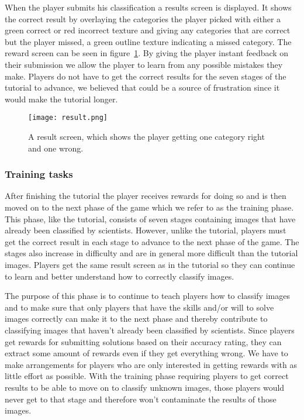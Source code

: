 When the player submits his classification a results screen is displayed. It shows the correct result by overlaying the categories the player picked with either a green correct or red incorrect texture and giving any categories that are correct but the player missed, a green outline texture indicating a missed category. The reward screen can be seen in figure~\ref{fig:result}. By giving the player instant feedback on their submission we allow the player to learn from any possible mistakes they make. Players do not have to get the correct results for the seven stages of the tutorial to advance, we believed that could be a source of frustration since it would make the tutorial longer. 

\begin{figure}[H]
\centering
\graphicspath{ {./graphics/} }
\centerline{\texttt{[image: result.png]}}
\caption{\label{fig:result}A result screen, which shows the player getting one category right and one wrong.}
\end{figure}

\subsubsection{Training tasks}
After finishing the tutorial the player receives rewards for doing so and is then moved on to the next phase of the game which we refer to as the training phase. This phase, like the tutorial, consists of seven stages containing images that have already been classified by scientists. However, unlike the tutorial, players must get the correct result in each stage to advance to the next phase of the game. The stages also increase in difficulty and are in general more difficult than the tutorial images. Players get the same result screen as in the tutorial so they can continue to learn and better understand how to correctly classify images. 

The purpose of this phase is to continue to teach players how to classify images and to make sure that only players that have the skills and/or will to solve images correctly can make it to the next phase and thereby contribute to classifying images that haven't already been classified by scientists. Since players get rewards for submitting solutions based on their accuracy rating, they can extract some amount of rewards even if they get everything wrong. We have to make arrangements for players who are only interested in getting rewards with as little effort as possible. With the training phase requiring players to get correct results to be able to move on to classify unknown images, those players would never get to that stage and therefore won't contaminate the results of those images.

